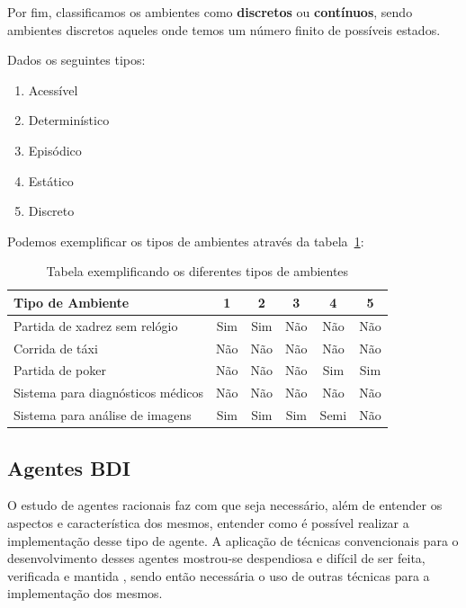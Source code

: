 Por fim, classificamos os ambientes como \textbf{discretos} ou
\textbf{contínuos}, sendo ambientes discretos aqueles onde temos um número
finito de possíveis estados.

Dados os seguintes tipos:

\begin{enumerate}
    \item Acessível
    \item Determinístico
    \item Episódico
    \item Estático
    \item Discreto
\end{enumerate}

Podemos exemplificar os tipos de ambientes através da
tabela~\ref{tab:ENVEXAMPLETABLE}:

\begin{table}[htb]
    \begin{center}
        \caption{\label{tab:ENVEXAMPLETABLE} Tabela exemplificando os
        diferentes tipos de ambientes}
        \begin{tabular}{| l | c | c | c | c | c |} \hline
            \textbf{Tipo de Ambiente}         & \textbf{1} & \textbf{2} & \textbf{3} & \textbf{4} & \textbf{5} \\ \hline
            Partida de xadrez sem relógio     & Sim        & Sim        & Não        & Não        & Não        \\ \hline
            Corrida de táxi                   & Não        & Não        & Não        & Não        & Não        \\ \hline
            Partida de poker                  & Não        & Não        & Não        & Sim        & Sim        \\ \hline
            Sistema para diagnósticos médicos & Não        & Não        & Não        & Não        & Não        \\ \hline
            Sistema para análise de imagens   & Sim        & Sim        & Sim        & Semi       & Não        \\ \hline
        \end{tabular}
    \end{center}
\end{table}

\subsection{Agentes BDI}
O estudo de agentes racionais faz com que seja necessário, além de entender os
aspectos e característica dos mesmos, entender como é possível realizar a
implementação desse tipo de agente. A aplicação de técnicas convencionais para
o desenvolvimento desses agentes mostrou-se despendiosa e difícil de ser feita,
verificada e mantida \cite{BDIFROMTHEORYTOPRACTICE}, sendo então necessária o
uso de outras técnicas para a implementação dos mesmos.


